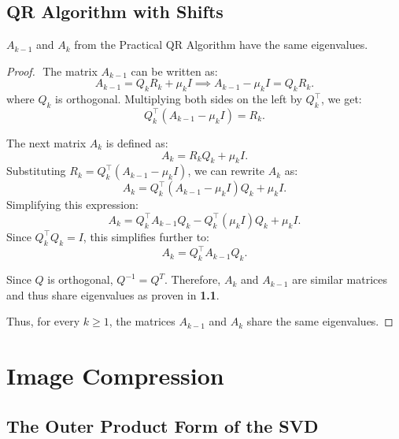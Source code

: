\documentclass[12pt]{article}
\begin{document}
\subsection{QR Algorithm with Shifts}
\( A_{k-1} \) and \( A_k \) from the Practical QR Algorithm have the same eigenvalues.
\begin{proof} $ $\newline
The matrix \( A_{k-1}\) can be written as:
\[
A_{k-1} = Q_k R_k + \mu_k I \implies A_{k-1} - \mu_k I = Q_k R_k.
\]
where \( Q_k \) is orthogonal. Multiplying both sides on the left by \( Q_k^\top \), we get:
\[
Q_k^\top (A_{k-1} - \mu_k I) = R_k.
\]

The next matrix \( A_k \) is defined as:
\[
A_k = R_k Q_k + \mu_k I.
\]
Substituting \( R_k = Q_k^\top (A_{k-1} - \mu_k I) \), we can rewrite \( A_k \) as:
\[
A_k = Q_k^\top (A_{k-1} - \mu_k I) Q_k + \mu_k I.
\]
Simplifying this expression:
\[
A_k = Q_k^\top A_{k-1} Q_k - Q_k^\top (\mu_k I) Q_k + \mu_k I.
\]
Since \( Q_k^\top Q_k = I \), this simplifies further to:
\[
A_k = Q_k^\top A_{k-1} Q_k.
\]

Since $Q$ is orthogonal, $Q^{-1} = Q^T$. Therefore, $A_k $ and $A_{k-1}$ are similar matrices and thus share eigenvalues as proven in \textbf{1.1}.

Thus, for every \( k \geq 1 \), the matrices \( A_{k-1} \) and \( A_k \) share the same eigenvalues.
\end{proof}

\section{Image Compression}
\subsection{The Outer Product Form of the SVD}
\end{document}
